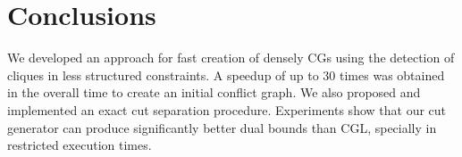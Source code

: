 \documentclass{endm}
\begin{document}
\section{Conclusions}\label{conclusions}

We developed an approach for fast creation of densely CGs using the detection of cliques in less structured constraints. A speedup of up to 30 times was obtained in the overall time to create an initial conflict graph. We also proposed and implemented an exact cut separation procedure. Experiments show that our cut generator can produce significantly better dual bounds than CGL, specially in restricted execution times.



\end{document}
